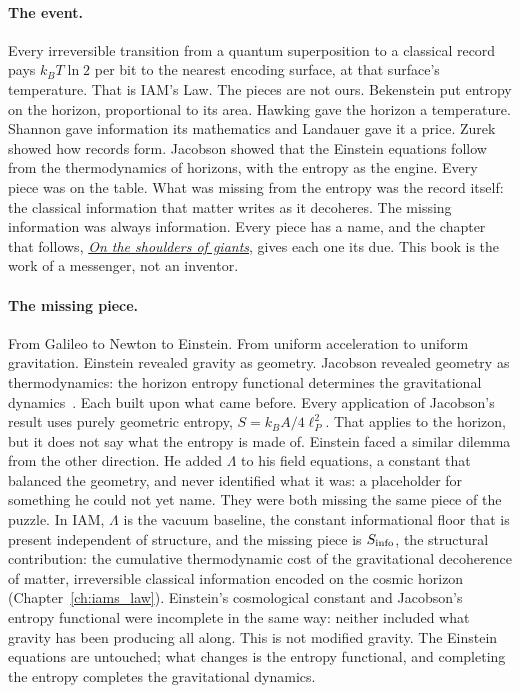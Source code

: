 \paragraph{The event.} Every irreversible transition from a quantum superposition to a classical record pays $k_BT\ln2$ per bit to the nearest
encoding surface, at that surface's temperature. That is IAM's Law. The pieces are not ours. Bekenstein put entropy on the horizon, proportional
to its area. Hawking gave the horizon a temperature. Shannon gave information its mathematics and Landauer gave it a price. Zurek showed how
records form. Jacobson showed that the Einstein equations follow from the thermodynamics of horizons, with the entropy as the engine. Every piece
was on the table. What was missing from the entropy was the record itself: the classical information that matter writes as it decoheres. The
missing information was always information.
Every piece has a name, and the chapter that follows, \hyperref[ch:giants]{\emph{On the shoulders of giants}}, gives each one its due.
This book is the work of a messenger, not an inventor.
\paragraph{The missing piece.} From Galileo to Newton to Einstein. From uniform acceleration to uniform gravitation. Einstein
revealed gravity as geometry. Jacobson revealed geometry as thermodynamics: the horizon entropy functional determines the gravitational
dynamics~\cite{Jacobson1995}. Each built upon what came before. Every application of Jacobson's result uses purely geometric entropy,
$S=k_BA/4\ell_P^2$. That applies to the horizon, but it does not say what the entropy is made of. Einstein faced a similar dilemma from the
other direction. He added $\Lambda$ to his field equations, a constant that balanced the geometry, and never identified what it was: a
placeholder for something he could not yet name. They were both missing the same piece of the puzzle. In IAM, $\Lambda$ is the vacuum baseline,
the constant informational floor that is present independent of structure, and the missing piece is $S_{\rm info}$, the structural contribution:
the cumulative thermodynamic cost of the gravitational decoherence of matter, irreversible classical information encoded on the cosmic horizon
(Chapter~\ref{ch:iams_law}). \conjecture{} Einstein's cosmological constant and Jacobson's entropy functional were incomplete in the same way:
neither included what gravity has been producing all along. \interp{} This is not modified gravity. The Einstein equations are untouched; what
changes is the entropy functional, and completing the entropy completes the gravitational dynamics.


